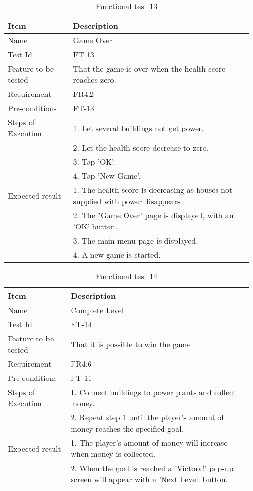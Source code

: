 \begin{table}[H]
\centering
	\begin{tabular}{ l | p{8cm} }
		\hline
		{\bf Item} & {\bf Description} \\ \hline
		Name & Game Over \\ 
		Test Id & FT-13 \\ 
		Feature to be tested & That the game is over when the health score reaches zero. \\ 
		Requirement & FR4.2 \\ 
		Pre-conditions & FT-13 \\ 
		Steps of Execution & 1. Let several buildings not get power. \\ 
		& 2. Let the health score decrease to zero. \\
		& 3. Tap 'OK'. \\
		& 4. Tap 'New Game'. \\
		Expected result & 1. The health score is decreasing as houses not supplied with power disappears. \\
		& 2. The "Game Over" page is displayed, with an 'OK' button. \\
		& 3. The main menu page is displayed. \\
		& 4. A new game is started. \\
	\end{tabular}
	\caption{Functional test 13}
\end{table}

\begin{table}[H]
\centering
	\begin{tabular}{ l | p{8cm} }
		\hline
		{\bf Item} & {\bf Description} \\ \hline
		Name & Complete Level \\ 
		Test Id & FT-14 \\ 
		Feature to be tested & That it is possible to win the game \\ 
		Requirement & FR4.6 \\ 
		Pre-conditions & FT-11 \\ 
		Steps of Execution & 1. Connect buildings to power plants and collect money. \\ 
		& 2. Repeat step 1 until the player's amount of money reaches the specified goal. \\
		Expected result & 1. The player's amount of money will increase when money is collected. \\ 
		& 2. When the goal is reached a 'Victory!' pop-up screen will appear with a 'Next Level' button. \\
	\end{tabular}
	\caption{Functional test 14}
\end{table}

